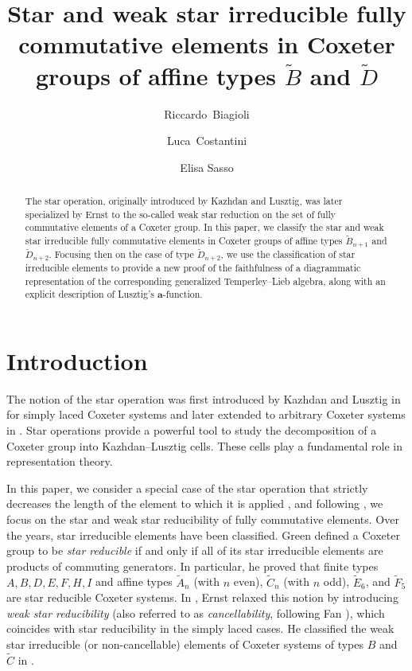\documentclass{amsart}
\title[Star and weak star irreducible FC elements]{Star and weak star irreducible fully commutative elements in Coxeter groups of affine types $\widetilde{B}$ and $\widetilde{D}$}
\author[R. Biagioli]{Riccardo~Biagioli}
\author[L. Costantini]{Luca~Costantini}
\author[E. Sasso]{Elisa Sasso}
\newcommand{\D}{{\widetilde{D}_{n+2}}}
\newcommand{\B}{{\widetilde{B}_{n+1}}}
\theoremstyle{definition}
\begin{document}
\begin{abstract}

The star operation, originally introduced by Kazhdan and Lusztig, was later specialized by Ernst to the so-called weak star reduction on the set of fully commutative elements of a Coxeter group. In this paper, we classify the star and weak star irreducible fully commutative elements in Coxeter groups of affine types $\B$ and $\D$. Focusing then on the case of type $\D$, we use the classification of star irreducible elements to provide a new proof of the faithfulness of a diagrammatic representation of the corresponding generalized Temperley–Lieb algebra, along with an explicit description of Lusztig’s 
$\mathbf{a}$-function.

\end{abstract}

\maketitle


\section*{Introduction}

The notion of the star operation was first introduced by Kazhdan and Lusztig in \cite{kazhdan_reps} for simply laced Coxeter systems and later extended to arbitrary Coxeter systems in \cite{lusztig_cells}. Star operations provide a powerful tool to study the decomposition of a Coxeter group into Kazhdan–Lusztig cells. These cells play a fundamental role in representation theory. 
\smallskip

In this paper, we consider a special case of the star operation that strictly decreases the length of the element to which it is applied \cite{GreenStar}, and  following \cite{ernst}, we focus on the star and weak star reducibility of fully commutative elements. Over the years, star irreducible elements have been classified. Green \cite{GreenStar} defined a Coxeter group to be \textit{star reducible} if and only if all of its star irreducible elements are products of commuting generators. In particular, he proved \cite[Theorem 6.3]{GreenStar} that finite types $A,B,D,E,F,H,I$ and affine types $\widetilde{A}_n$ (with $n$ even), $\widetilde{C}_n$ (with $n$ odd), $\widetilde{E}_6$, and $\widetilde{F}_5$ are star reducible Coxeter systems. 
In \cite{ernst}, Ernst relaxed this notion by introducing  \textit{weak star reducibility}  (also referred to as \textit{cancellability}, following Fan \cite{Fan}), which coincides with star reducibility in the simply laced cases. He classified the weak star irreducible (or non-cancellable) elements of Coxeter systems of types $B$ and $\widetilde{C}$ in \cite[Theorem 4.2.1, Theorem 5.1.1]{ernst}. 
\smallskip
\end{document}
